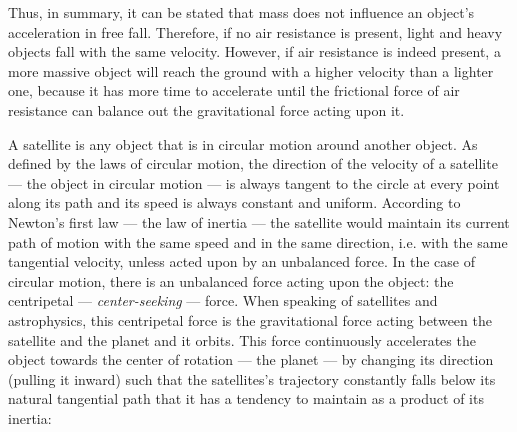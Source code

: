 \pagebreak

Thus, in summary, it can be stated that mass does not influence an object's acceleration in free fall. Therefore, if no air resistance is present, light and heavy objects fall with the same velocity. However, if air resistance is indeed present, a more massive object will reach the ground with a higher velocity than a lighter one, because it has more time to accelerate until the frictional force of air resistance can balance out the gravitational force acting upon it. 


A satellite is any object that is in circular motion around another object. As defined by the laws of circular motion, the direction of the velocity of a satellite --- the object in circular motion --- is always tangent to the circle at every point along its path and its speed is always constant and uniform. According to Newton's first law --- the law of inertia --- the satellite would maintain its current path of motion with the same speed and in the same direction, i.e. with the same tangential velocity, unless acted upon by an unbalanced force. In the case of circular motion, there is an unbalanced force acting upon the object: the centripetal --- \emph{center-seeking} --- force. When speaking of satellites and astrophysics, this centripetal force is the gravitational force acting between the satellite and the planet and it orbits. This force continuously accelerates the object towards the center of rotation --- the planet --- by changing its direction (pulling it inward) such that the satellites's trajectory constantly falls below its natural tangential path that it has a tendency to maintain as a product of its inertia:

